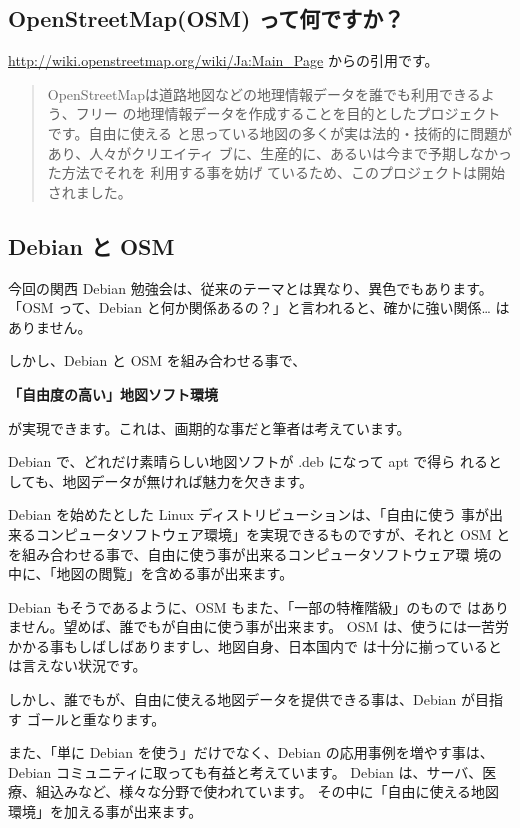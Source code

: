 \documentclass[mingoth,a4paper]{jsarticle}
\begin{document}
\subsection{OpenStreetMap(OSM) って何ですか？}
\url{http://wiki.openstreetmap.org/wiki/Ja:Main_Page} からの引用です。

\begin{quotation}
OpenStreetMapは道路地図などの地理情報データを誰でも利用できるよう、フリー
の地理情報データを作成することを目的としたプロジェクトです。自由に使える
と思っている地図の多くが実は法的・技術的に問題があり、人々がクリエイティ
ブに、生産的に、あるいは今まで予期しなかった方法でそれを 利用する事を妨げ
ているため、このプロジェクトは開始されました。
\end{quotation}

\subsection{Debian と OSM}

今回の関西 Debian 勉強会は、従来のテーマとは異なり、異色でもあります。
「OSM って、Debian と何か関係あるの？」と言われると、確かに強い関係…
はありません。

しかし、Debian と OSM を組み合わせる事で、

\begin{center}
 \textbf{{\large「自由度の高い」地図ソフト環境} }
\end{center}

が実現できます。これは、画期的な事だと筆者は考えています。

Debian で、どれだけ素晴らしい地図ソフトが .deb になって apt で得ら
れるとしても、地図データが無ければ魅力を欠きます。

Debian を始めたとした Linux ディストリビューションは、「自由に使う
事が出来るコンピュータソフトウェア環境」を実現できるものですが、それと
OSM とを組み合わせる事で、自由に使う事が出来るコンピュータソフトウェア環
境の中に、「地図の閲覧」を含める事が出来ます。

Debian もそうであるように、OSM もまた、「一部の特権階級」のもので
はありません。望めば、誰でもが自由に使う事が出来ます。
OSM は、使うには一苦労かかる事もしばしばありますし、地図自身、日本国内で
は十分に揃っているとは言えない状況です。

しかし、誰でもが、自由に使える地図データを提供できる事は、Debian が目指す
ゴールと重なります。

また、「単に Debian を使う」だけでなく、Debian の応用事例を増やす事は、
Debian コミュニティに取っても有益と考えています。
Debian は、サーバ、医療、組込みなど、様々な分野で使われています。
その中に「自由に使える地図環境」を加える事が出来ます。
\end{document}
